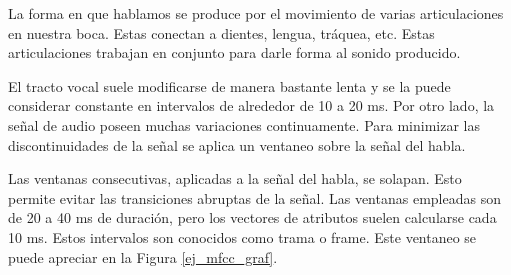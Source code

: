 La forma en que hablamos se produce por el movimiento de varias articulaciones en nuestra boca. Estas conectan a dientes, lengua, tráquea, etc. Estas articulaciones trabajan en conjunto para darle forma al sonido producido. 

El tracto vocal suele modificarse de manera bastante lenta y se la puede considerar constante en intervalos de alrededor de 10 a 20 ms. Por otro lado, la señal de audio poseen muchas variaciones continuamente. Para minimizar las discontinuidades de la señal se aplica un ventaneo sobre la señal del habla. 

Las ventanas consecutivas, aplicadas a la señal del habla, se solapan. Esto permite evitar las transiciones abruptas de la señal. Las ventanas empleadas son de 20 a 40 ms de duración, pero los vectores de atributos suelen calcularse cada 10 ms. Estos intervalos son conocidos como trama o frame. Este ventaneo se puede apreciar en la Figura \ref{ej_mfcc_graf}.

\newcommand{\mfccvec}[3]%
{  
	\node[fill={rgb:black,1;white,2;white,3}, rounded corners, draw, inner sep=+0pt] at (#1,#2) {\tiny \begin{tabular}{c}
		Coef 1\\\hline
		Coef 2\\\hline
		Coef 3\\\hline
		...\\\hline
		Coef N\\
	\end{tabular}};
	\node at (#1, #2-1) {{\tiny #3}};
}

\newcommand{\mfccvecmax}[3]%
{  
	\node[fill={rgb:red,1;white,2;white,3}, rounded corners, draw, inner sep=+0pt] at (#1,#2) {\tiny \begin{tabular}{c}
		Max(T1.coef1, T2.coef1, ... , TM.coef1)\\\hline
		Max(T1.coef2, T2.coef2, ... , TM.coef2)\\\hline
		Max(T1.coef3, T2.coef3, ... , TM.coef3)\\\hline
		...\\\hline
		Max(T1.coefN, T2.coefN, ... , TM.coefN)\\
	\end{tabular}};
	\node at (#1, #2-1) {{\tiny #3}};
}

\newcommand{\intervalo}[2]%
{  
	\draw (#1,#2) -- (#1+0.8,#2);
	\draw (#1,#2-.1) -- (#1, #2+.1);
	\draw (#1+0.8,#2-.1) -- (#1+0.8, #2+.1);

	\draw (#1,#2) -- (#1+.1,#2+.05);
	\draw (#1,#2) -- (#1+.1,#2-.05);

	\draw (#1+0.8,#2) -- (#1+0.8-.1,#2+.05);
	\draw (#1+0.8,#2) -- (#1+0.8-.1,#2-.05);
}

